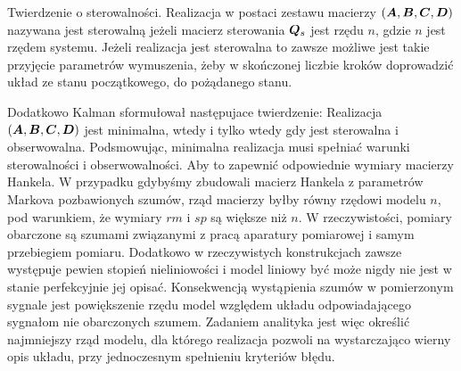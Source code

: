 Twierdzenie o sterowalności. Realizacja w postaci zestawu macierzy $(\bm{A},\bm{B},\bm{C},\bm{D})$ nazywana jest sterowalną jeżeli macierz sterowania $\bm{Q}_s$ jest rzędu $n$, gdzie $n$ jest rzędem systemu. Jeżeli realizacja jest sterowalna to zawsze możliwe jest takie przyjęcie parametrów wymuszenia, żeby w skończonej liczbie kroków doprowadzić układ ze stanu początkowego, do pożądanego stanu.

Dodatkowo Kalman sformułował następujace twierdzenie: Realizacja $(\bm{A},\bm{B},\bm{C},\bm{D})$ jest minimalna, wtedy i tylko wtedy gdy jest sterowalna i obserwowalna.
Podsmowując, minimalna realizacja musi spełniać warunki sterowalności i obserwowalności. Aby to zapewnić odpowiednie wymiary macierzy Hankela. W przypadku gdybyśmy zbudowali macierz Hankela z parametrów Markova pozbawionych szumów, rząd macierzy byłby równy rzędowi modelu $n$, pod warunkiem, że wymiary $rm$ i $sp$ są większe niż $n$. W rzeczywistości, pomiary obarczone są szumami związanymi z pracą aparatury pomiarowej i samym przebiegiem pomiaru. Dodatkowo w rzeczywistych konstrukcjach zawsze występuje pewien stopień nieliniowości i model liniowy być może nigdy nie jest w stanie perfekcyjnie jej opisać. Konsekwencją wystąpienia szumów w pomierzonym sygnale jest powiększenie rzędu model względem układu odpowiadającego sygnałom nie obarczonych szumem. Zadaniem analityka jest więc określić najmniejszy rząd modelu, dla którego realizacja pozwoli na wystarczająco wierny opis układu, przy jednoczesnym spełnieniu kryteriów błędu.

